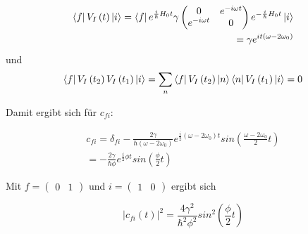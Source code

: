 \begin{align}
\Bra{f} V_I \left( t \right) \Ket{i} = \Bra{f} e^{\frac{i}{\hbar} H_0 t} \gamma 
\begin{pmatrix}
0 & e^{-i \omega t} \\ e^{-i \omega t} & 0
\end{pmatrix}
e^{-\frac{i}{\hbar} H_0 t} \Ket{i} \\
= \gamma e^{it \left(\omega - 2 \omega_0 \right)}
\end{align}
und
\begin{align}
\Bra{f} V_I \left( t_2 \right) V_I \left( t_1 \right) \Ket{i} = \sum_n \Bra{f} V_I \left( t_2 \right)\Ket{n} \Bra{n} V_I \left( t_1 \right) \Ket{i} = 0
\end{align}

Damit ergibt sich f\"ur $c_{fi}$:

\begin{align}
c_{fi} = \delta_{fi} - \frac{2\gamma}{\hbar \left(\omega -2\omega_0\right)} e^{\frac{i}{2} \left(\omega -2\omega_0\right) t} sin \left(\frac{\omega -2\omega_0}{2} t \right)\\
= - \frac{2\gamma}{\hbar \phi} e^{\frac{i}{2} \phi t} sin \left(\frac{\phi}{2} t \right)
\end{align}

Mit $f = \begin{pmatrix}0&1\end{pmatrix}$ und $i = \begin{pmatrix}1&0\end{pmatrix}$ ergibt sich

\begin{equation}
|c_{fi} \left(t\right)|^2 = \frac{4 \gamma^2}{\hbar^2 \phi^2} sin^2 \left(\frac{\phi}{2}t \right)
\end{equation}
